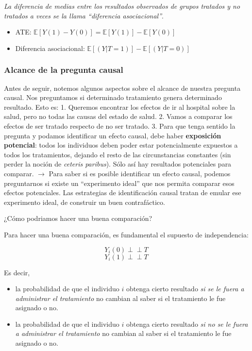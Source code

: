 \documentclass[
  a4paper,
  DIV=11,
  numbers=noendperiod]{scrreprt}
\providecommand{\tightlist}{%
  \setlength{\itemsep}{0pt}\setlength{\parskip}{0pt}}\usepackage{longtable,booktabs,array}
\begin{document}
\emph{La diferencia de medias entre los resultados observados de grupos
tratados y no tratados a veces se la llama ``diferencia asociacional''}.

\begin{itemize}
\tightlist
\item
  ATE: \(\mathbb{E}[Y(1) - Y(0)] = \mathbb{E}[Y(1)] - \mathbb{E}[Y(0)]\)
\item
  Diferencia asociacional: \(\mathbb{E}[(Y|T=1)] - \mathbb{E}[(Y|T=0)]\)
\end{itemize}

\subsubsection{Alcance de la pregunta
causal}\label{alcance-de-la-pregunta-causal}

Antes de seguir, notemos algunos aspectos sobre el alcance de nuestra
pregunta causal. Nos preguntamos si determinado tratamiento genera
determinado resultado. Esto es: 1. Queremos encontrar los efectos de ir
al hospital sobre la salud, pero no todas las causas del estado de
salud. 2. Vamos a comparar los efectos de ser tratado respecto de no ser
tratado. 3. Para que tenga sentido la pregunta y podamos identificar un
efecto causal, debe haber \textbf{exposición potencial}: todos los
individuos deben poder estar potencialmente expuestos a todos los
tratamientos, dejando el resto de las circunstancias constantes (sin
perder la noción de \emph{ceteris paribus}). Sólo así hay resultados
potenciales para comparar. \(→\) Para saber si es posible identificar un
efecto causal, podemos preguntarnos si existe un ``experimento ideal''
que nos permita comparar esos efectos potenciales. Las estrategias de
identificación causal tratan de emular ese experimento ideal, de
construir un buen contrafáctico.

¿Cómo podriamos hacer una buena comparación?

Para hacer una buena comparación, es fundamental el supuesto de
independencia:

\[ Y_i(0) {\perp\!\!\!\perp} T\] \[ Y_i(1) {\perp\!\!\!\perp} T\]

Es decir,

\begin{itemize}
\tightlist
\item
  la probabilidad de que el individuo \(i\) obtenga cierto resultado
  \emph{si se le fuera a administrar el tratamiento} no cambian al saber
  si el tratamiento le fue asignado o no.
\item
  la probabilidad de que el individuo \(i\) obtenga cierto resultado
  \emph{si no se le fuera a administrar el tratamiento} no cambian al
  saber si el tratamiento le fue asignado o no.
\end{itemize}
\end{document}
